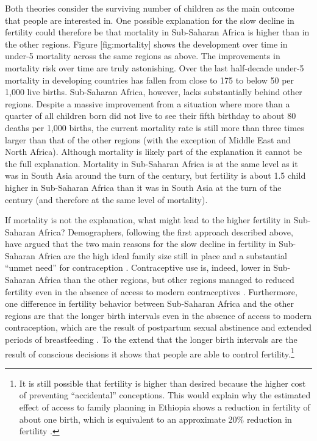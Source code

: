 \documentclass[]{article}
\begin{document}
Both theories consider the surviving number of children as the main outcome that people are interested in. One possible explanation for the slow decline in fertility could therefore be that mortality in Sub-Saharan Africa is higher than in the other regions. Figure {[}fig:mortality{]} shows the development over time in under-5 mortality across the same regions as above. The improvements in mortality risk over time are truly astonishing. Over the last half-decade under-5 mortality in developing countries has fallen from close to 175 to below 50 per 1,000 live births. Sub-Saharan Africa, however, lacks substantially behind other regions. Despite a massive improvement from a situation where more than a quarter of all children born did not live to see their fifth birthday to about 80 deaths per 1,000 births, the current mortality rate is still more than three times larger than that of the other regions (with the exception of Middle East and North Africa). Although mortality is likely part of the explanation it cannot be the full explanation. Mortality in Sub-Saharan Africa is at the same level as it was in South Asia around the turn of the century, but fertility is about 1.5 child higher in Sub-Saharan Africa than it was in South Asia at the turn of the century (and therefore at the same level of mortality).

If mortality is not the explanation, what might lead to the higher fertility in Sub-Saharan Africa? Demographers, following the first approach described above, have argued that the two main reasons for the slow decline in fertility in Sub-Saharan Africa are the high ideal family size still in place and a substantial ``unmet need'' for contraception \citep{Bongaarts2013a,Singh2017}. Contraceptive use is, indeed, lower in Sub-Saharan Africa than the other regions, but other regions managed to reduced fertility even in the absence of access to modern contraceptives \citet{Schultz1985,Galloway1987,Bailey1998,bengtsson06}. Furthermore, one difference in fertility behavior between Sub-Saharan Africa and the other regions are that the longer birth intervals even in the absence of access to modern contraception, which are the result of postpartum sexual abstinence and extended periods of breastfeeding \citep{Caldwell1992}. To the extend that the longer birth intervals are the result of conscious decisions it shows that people are able to control fertility.\footnote{It is still possible that fertility is higher than desired because the higher cost of preventing ``accidental'' conceptions. This would explain why the estimated effect of access to family planning in Ethiopia shows a reduction in fertility of about one birth, which is equivalent to an approximate 20\% reduction in fertility \citet{Portner2014a}.}
\end{document}
